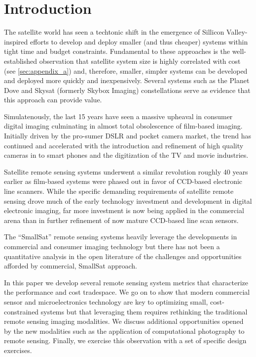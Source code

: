 \documentclass[]{spieman}  %
\begin{document}



\section{Introduction}
\label{sec:introduction}

    The satellite world has seen a techtonic shift in the emergence of Sillicon Valley-inspired efforts to develop and deploy smaller (and thus cheaper) systems within tight time and budget constraints.  Fundamental to these approaches is the well-established observation that satellite system size is highly correlated with cost (see \ref{sec:appendix_a}) and, therefore, smaller, simpler systems can be developed and deployed more quickly and inexpensively.  Several systems such as the Planet Dove and Skysat (formerly Skybox Imaging) constellations serve as evidence that this approach can provide value.

Simulatenously, the last 15 years have seen a massive upheaval in consumer digital imaging culminating in almost total obsolescence of film-based imaging.  Initially driven by the pro-sumer DSLR and pocket camera market, the trend has continued and accelerated with the introduction and refinement of high quality cameras in to smart phones and the digitization of the TV and movie industries.

Satellite remote sensing systems underwent a similar revolution roughly 40 years earlier as film-based systems were phased out in favor of CCD-based electronic line scanners.  While the specific demanding requirements of satellite remote sensing drove much of the early technology investment and development in digital electronic imaging, far more investment is now being applied in the commercial arena than in further refinement of now mature CCD-based line scan sensors.

The ``SmallSat'' remote sensing systems heavily leverage the developments in commercial and consumer imaging technology but there has not been a quantitative analysis in the open literature of the challenges and opportunities afforded by commercial, SmallSat approach.

In this paper we develop several remote sensing system metrics that characterize the performance and cost tradespace.  We go on to show that modern commercial sensor and microelectronics technology are key to optimizing small, cost-constrained systems but that leveraging them requires rethinking the traditional remote sensing imaging modalities.  We discuss additional opportunities opened by the new modalities such as the application of computational photography to remote sensing.  Finally, we exercise this observation with a set of specific design exercises.  
\end{document}
